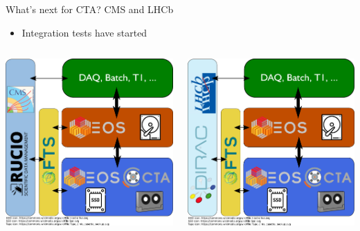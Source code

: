\documentclass[aspectratio=1610]{beamer}
\begin{document}
\begin{frame}{What's next for CTA? CMS and LHCb}
   \begin{itemize}
      \item Integration tests have started
   \end{itemize}
\begin{columns}
	\begin{column}{0.4\textwidth}
		\begin{center}
		  \includegraphics[width=\textwidth]{images/CTA_Deployment_CMS.pdf}
		\end{center}
	\end{column}
	\begin{column}{0.4\textwidth}
		\begin{center}
		  \includegraphics[width=\textwidth]{images/CTA_Deployment_LHCb.pdf}

\end{center}
\end{column}
\end{columns}
\end{frame}
\end{document}
